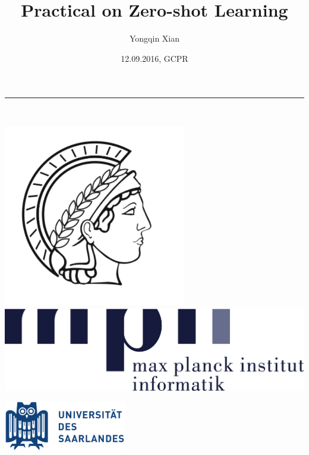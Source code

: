 \documentclass[mathserif, xcolor=table]{beamer}
\title{Practical on Zero-shot Learning}
\author{Yongqin Xian \vspace{2mm}\\}
\institute{Max-Planck Institute for Informatics}
\date{12.09.2016, GCPR}
\begin{document}

\begin{frame}
\color{jblue}\rule{4.3in}{0.02\paperwidth} \\ \vspace{-2mm}
\begin{minipage}{0.2\textwidth}
\includegraphics[width=0.6\textwidth,trim=0 -40 0 0]{minerva_solo.pdf}
\includegraphics[width=1.2\textwidth,trim=0 -300 0 0]{Logo_MPII}
\end{minipage}
\hfill
\begin{minipage}{0.5\textwidth} \hfill
\includegraphics[width=0.4\textwidth,trim=0 -30 50 0]{SaarlandUni}
\end{minipage}
\titlepage
\end{frame}
\end{document}
